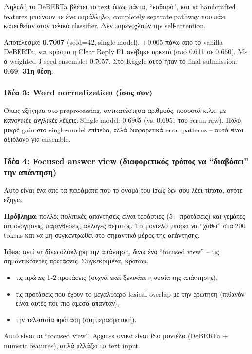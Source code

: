 \documentclass[12pt]{fphw}
\begin{document}
Δηλαδή το DeBERTa βλέπει το text όπως πάντα, ``καθαρό'', και τα handcrafted features μπαίνουν με ένα παράλληλο, completely separate pathway που πάει κατευθείαν στον τελικό classifier. Δεν παρενοχλούν την self-attention.

Αποτέλεσμα: \textbf{0.7007} (seed=42, single model). +0.005 πάνω από το vanilla DeBERTa, και κρίσιμα η Clear Reply F1 ανέβηκε αρκετά (από 0.611 σε 0.660). Με α-weighted 3-seed ensemble: 0.7057. Στο Kaggle αυτό ήταν το final submission: \textbf{0.69, 31η θέση}.

\subsubsection{Ιδέα 3: Word normalization (ίσος συν)}

Όπως εξήγησα στο preprocessing, αντικατέστησα αριθμούς, ποσοστά κ.λπ. με κανονικές αγγλικές λέξεις. Single model: 0.6965 (vs. 0.6951 του rerun raw). Πολύ μικρό gain στο single-model επίπεδο, αλλά διαφορετικά error patterns -- αυτό είναι αξιόλογο για ensemble.

\subsubsection{Ιδέα 4: Focused answer view (διαφορετικός τρόπος να ``διαβάσει'' την απάντηση)}

Αυτό είναι ένα από τα πειράματα που το όνομά του ίσως δεν σου λέει τίποτα, οπότε εξηγώ.

\textbf{Πρόβλημα}: πολλές πολιτικές απαντήσεις είναι τεράστιες (5+ προτάσεις) και γεμάτες αιτιολογήσεις, παρενθέσεις, αλλαγές θέματος. Το μοντέλο μπορεί να ``χαθεί'' στα 200 tokens και να μη συγκεντρωθεί στο σημαντικό μέρος της απάντησης.

\textbf{Idea}: αντί να δίνω ολόκληρη την απάντηση, δίνω ένα ``focused view'' -- τις σημαντικότερες προτάσεις. Συγκεκριμένα, κρατάω:
\begin{itemize}
    \item τις πρώτες 1-2 προτάσεις (συχνά εκεί ξεκινάει η ουσία της απάντησης),
    \item τις προτάσεις που έχουν το μεγαλύτερο lexical overlap με την ερώτηση (πιθανόν είναι αυτές που πιο άμεσα απαντάν),
    \item την τελευταία πρόταση (συμπερασματική).
\end{itemize}
Αυτό είναι το ``focused view''. Αρχιτεκτονικά είναι ίδιο μοντέλο (DeBERTa + numeric features), απλά αλλάζει το text input.
\end{document}
